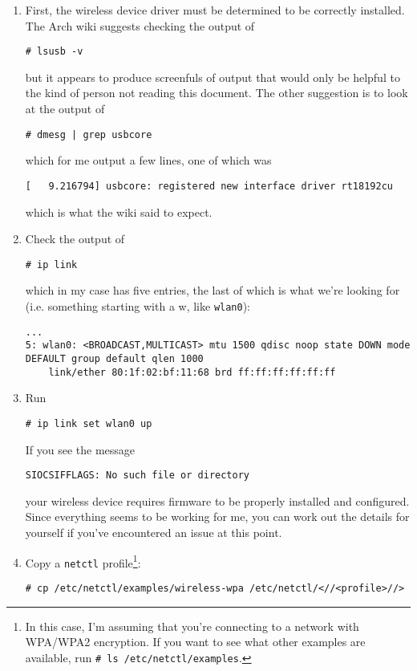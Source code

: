 \documentclass[12pt,letterpaper]{article}
\begin{document}
\begin{enumerate}
\item First, the wireless device driver must be determined to be correctly installed.  The Arch wiki suggests checking the output of
\begin{lstlisting}
# lsusb -v
\end{lstlisting}
but it appears to produce screenfuls of output that would only be helpful to the kind of person not reading this document.  The other suggestion is to look at the output of
\begin{lstlisting}
# dmesg | grep usbcore
\end{lstlisting}
which for me output a few lines, one of which was
\begin{lstlisting}
[   9.216794] usbcore: registered new interface driver rt18192cu
\end{lstlisting}
which is what the wiki said to expect.  

\item Check the output of
\begin{lstlisting}
# ip link
\end{lstlisting}
which in my case has five entries, the last of which is what we're looking for (i.e. something starting with a w, like \lstinline{wlan0}):
\begin{lstlisting}
...
5: wlan0: <BROADCAST,MULTICAST> mtu 1500 qdisc noop state DOWN mode DEFAULT group default qlen 1000
    link/ether 80:1f:02:bf:11:68 brd ff:ff:ff:ff:ff:ff
\end{lstlisting}

\item Run
\begin{lstlisting}
# ip link set wlan0 up
\end{lstlisting}
If you see the message
\begin{lstlisting}
SIOCSIFFLAGS: No such file or directory
\end{lstlisting}
your wireless device requires firmware to be properly installed and configured.  Since everything seems to be working for me, you can work out the details for yourself if you've encountered an issue at this point.


\item Copy a \lstinline{netctl} profile\footnote{In this case, I'm assuming that you're connecting to a network with WPA/WPA2 encryption.  If you want to see what other examples are available, run \lstinline{# ls /etc/netctl/examples}.}:
\begin{lstlisting}
# cp /etc/netctl/examples/wireless-wpa /etc/netctl/<//<profile>//>
\end{lstlisting}


\end{enumerate}
\end{document}
